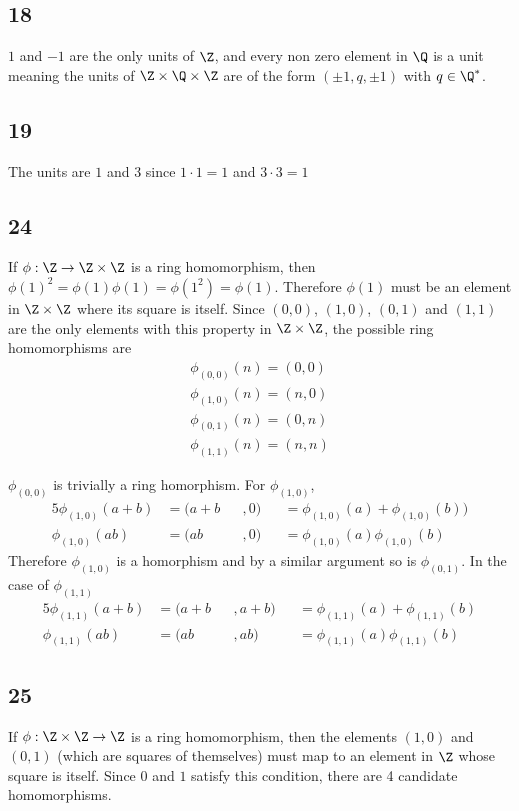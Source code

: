 \documentclass[12pt,titlepage]{extarticle}
\begin{document}
\subsection*{18}
$1$ and $-1$ are the only units of $\Z$, and every non zero element in $\Q$ is a unit meaning the units of $\Z \times \Q \times \Z$ are of the form $(\pm 1, q, \pm 1)$ with $q \in \Q^*$.

\subsection*{19}
The units are $1$ and $3$ since $1\cdot 1 = 1$ and $3 \cdot 3 = 1$

\subsection*{24}
If $\phi : \Z \to \Z \times \Z$ is a ring homomorphism, then $\phi(1)^2 = \phi(1) \phi(1) = \phi(1^2) = \phi(1)$. Therefore $\phi(1)$ must be an element in $\Z \times \Z$ where its square is itself. Since $(0,0)$, $(1, 0)$, $(0,1)$ and $(1,1)$ are the only elements with this property in $\Z \times \Z$, the possible ring homomorphisms are
\begin{align*}
    \phi_{(0,0)} (n) = (0,0) \\
    \phi_{(1,0)} (n) = (n,0) \\
    \phi_{(0,1)} (n) = (0,n) \\
    \phi_{(1,1)} (n) = (n,n)
\end{align*}

$\phi_{(0,0)}$ is trivially a ring homorphism. For $\phi_{(1,0)}$,
\begin{alignat*}{5}
    \phi_{(1,0)}(a + b) &= (a + b&&, 0) &&= \phi_{(1,0)}(a) + \phi_{(1,0)}(b)) \\
    \phi_{(1,0)}(ab) &= (ab&&, 0) &&= \phi_{(1,0)}(a) \phi_{(1,0)}(b)
\end{alignat*}
Therefore $\phi_{(1,0)}$ is a homorphism and by a similar argument so is $\phi_{(0,1)}$. In the case of $\phi_{(1,1)}$
\begin{alignat*}{5}
    \phi_{(1,1)}(a + b) &= (a + b&&, a + b) &&= \phi_{(1,1)}(a) + \phi_{(1,1)}(b) \\
    \phi_{(1,1)}(ab) &= (ab&&, ab) &&= \phi_{(1,1)}(a) \phi_{(1,1)}(b)
\end{alignat*}

\subsection*{25}
If $\phi : \Z \times \Z \to \Z$ is a ring homomorphism, then the elements $(1,0)$ and $(0,1)$ (which are squares of themselves) must map to an element in $\Z$ whose square is itself. Since $0$ and $1$ satisfy this condition, there are 4 candidate homomorphisms.
\end{document}
